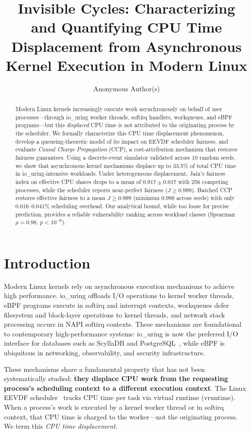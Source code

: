 \documentclass{article}
\title{Invisible Cycles: Characterizing and Quantifying CPU Time Displacement from Asynchronous Kernel Execution in Modern Linux}
\author{
  Anonymous Author(s)
}
\begin{document}
\maketitle

\begin{abstract}
Modern Linux kernels increasingly execute work asynchronously on behalf of user processes---through io\_uring worker threads, softirq handlers, workqueues, and eBPF programs---but this \emph{displaced} CPU time is not attributed to the originating process by the scheduler.
We formally characterize this CPU time displacement phenomenon, develop a queueing-theoretic model of its impact on EEVDF scheduler fairness, and evaluate \emph{Causal Charge Propagation} (CCP), a cost-attribution mechanism that restores fairness guarantees.
Using a discrete-event simulator validated across 10 random seeds, we show that asynchronous kernel mechanisms displace up to 33.5\% of total CPU time in io\_uring-intensive workloads. Under heterogeneous displacement, Jain's fairness index on effective CPU shares drops to a mean of $0.917 \pm 0.017$ with 256 competing processes, while the scheduler reports near-perfect fairness ($J \geq 0.999$). Batched CCP restores effective fairness to a mean $J \geq 0.999$ (minimum $0.998$ across seeds) with only 0.016--0.041\% scheduling overhead.
Our analytical bound, while too loose for precise prediction, provides a reliable vulnerability ranking across workload classes (Spearman $\rho = 0.98$, $p < 10^{-6}$).
\end{abstract}

\section{Introduction}

Modern Linux kernels rely on asynchronous execution mechanisms to achieve high performance. io\_uring offloads I/O operations to kernel worker threads, eBPF programs execute in softirq and interrupt contexts, workqueues defer filesystem and block-layer operations to kernel threads, and network stack processing occurs in NAPI softirq contexts.
These mechanisms are foundational to contemporary high-performance systems: io\_uring is now the preferred I/O interface for databases such as ScyllaDB and PostgreSQL~\citep{jasny2025high}, while eBPF is ubiquitous in networking, observability, and security infrastructure.

These mechanisms share a fundamental property that has not been systematically studied: \textbf{they displace CPU work from the requesting process's scheduling context to a different execution context}. The Linux EEVDF scheduler~\citep{stoica1996proportional} tracks CPU time per task via virtual runtime (vruntime). When a process's work is executed by a kernel worker thread or in softirq context, that CPU time is charged to the worker---not the originating process. We term this \emph{CPU time displacement}.
\end{document}
